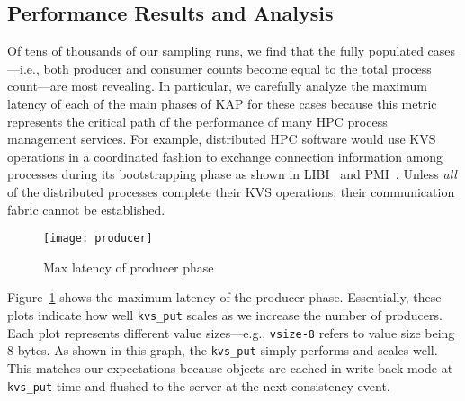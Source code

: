 \subsection{Performance Results and Analysis}
\label{results}
Of tens of thousands of our sampling runs, we find that the fully populated
cases---i.e., both producer and consumer counts become equal to the total
process count---are most revealing. In particular, we carefully analyze 
the maximum latency of each of the main phases of KAP for these cases 
because this metric represents the critical path of the performance of
many HPC process management services. For example, distributed 
HPC software would use KVS operations in a coordinated fashion to exchange 
connection information among processes during its bootstrapping 
phase as shown in LIBI~\cite{LIBI} and PMI~\cite{PMI2}. Unless {\em all} 
of the distributed processes complete their
KVS operations, their communication fabric cannot be established. 

\begin{figure}
  \centering
  \texttt{[image: producer]}
  \caption{Max latency of producer phase}
  \vspace{-.4cm}	
  \label{fig:prod}
\end{figure}

Figure~\ref{fig:prod} shows the maximum latency of the producer phase.
Essentially, these plots indicate how well {\tt kvs\_put}
scales as we increase the number of producers. Each plot represents
different value sizes---e.g., {\tt vsize-8} refers to value size being
8 bytes. As shown in this graph, the {\tt kvs\_put} simply performs and
scales well. This matches our expectations because objects
are cached in write-back mode at {\tt kvs\_put} time and flushed to the
server at the next consistency event. 

%
%

